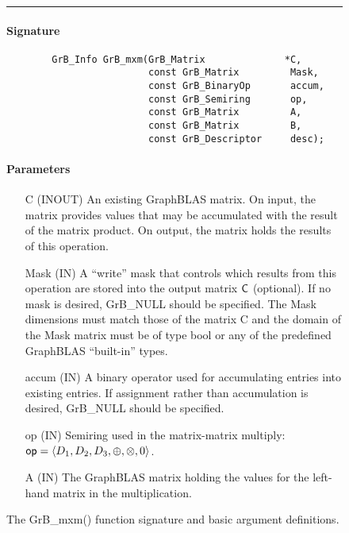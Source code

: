 \begin{figure*}[h]
\hrule
	\caption{The {\sf GrB\_mxm()} function signature and basic argument definitions.}
\label{Fig:mxm}
\paragraph{Signature}

\begin{verbatim}
        GrB_Info GrB_mxm(GrB_Matrix              *C,
                         const GrB_Matrix         Mask,
                         const GrB_BinaryOp       accum,
                         const GrB_Semiring       op,
                         const GrB_Matrix         A, 
                         const GrB_Matrix         B,
                         const GrB_Descriptor     desc);
\end{verbatim}

\paragraph{Parameters}

\begin{itemize}[leftmargin=1.1in]
    \item[{\sf C}]    ({\sf INOUT}) An existing GraphBLAS matrix. On
    input, the matrix provides values that may be accumulated with the
    result of the matrix product.   On output, the matrix holds the
    results of this operation.

    \item[{\sf Mask}] ({\sf IN}) A ``write'' mask that controls which
    results from this operation are stored into the output matrix
    ${\sf C}$ (optional).  If no mask is desired,  {\sf GrB\_NULL}
    should be specified. The Mask dimensions must match those of the
    matrix {\sf C} and the domain of the {\sf Mask} matrix must be
    of type {\sf bool} or any of the predefined GraphBLAS ``built-in'' types.

    \item[{\sf accum}] ({\sf IN}) A binary operator used for accumulating entries
    into existing  entries. If assignment rather than accumulation is
    desired, {\sf GrB\_NULL} should be specified.

    \item[{\sf op}] ({\sf IN}) Semiring used in the matrix-matrix
    multiply: ${\sf op}=\langle D_1,D_2,D_3,\oplus,\otimes,0 \rangle$.

    \item[{\sf A}] ({\sf IN}) The GraphBLAS matrix holding the values
    for the left-hand matrix in the multiplication.


\end{itemize}
\end{figure*}
